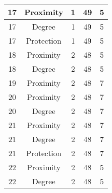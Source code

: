 \documentclass[results.tex]{subfiles}
\begin{document}
\begin{center}
\begin{tabular}{| c || c | c | c | c |}
            \hline
            17                      & Proximity                    & 1                      & 49                      & 5                    \\
            \hline
            17                      & Degree                       & 1                      & 49                      & 5                    \\
            \hline
            17                      & Protection                   & 1                      & 49                      & 5                    \\
            \hline
            18                      & Proximity                    & 2                      & 48                      & 5                    \\
            \hline
            18                      & Degree                       & 2                      & 48                      & 5                    \\
            \hline
            19                      & Proximity                    & 2                      & 48                      & 7                    \\
            \hline
            20                      & Proximity                    & 2                      & 48                      & 7                    \\
            \hline
            20                      & Degree                       & 2                      & 48                      & 7                    \\
            \hline
            21                      & Proximity                    & 2                      & 48                      & 7                    \\
            \hline
            21                      & Degree                       & 2                      & 48                      & 7                    \\
            \hline
            21                      & Protection                   & 2                      & 48                      & 7                    \\
            \hline
            22                      & Proximity                    & 2                      & 48                      & 5                    \\
            \hline
            22                      & Degree                       & 2                      & 48                      & 5                    \\

\end{tabular}
\end{center}
\end{document}
